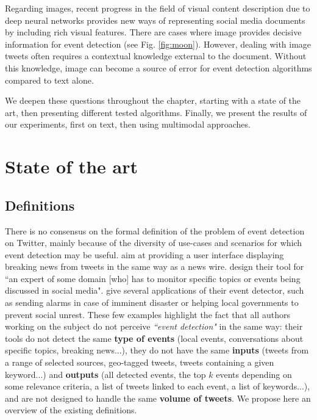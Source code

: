  Regarding images, recent progress in the field of visual content description due to deep neural networks provides new ways of representing social media documents by including rich visual features. There are cases where image provides decisive information for event detection (see Fig. \ref{fig:moon}). However, dealing with image tweets often requires a contextual knowledge external to the document. Without this knowledge, image can become a source of error for event detection algorithms compared to text alone.
 
We deepen these questions throughout the chapter, starting with a state of the art, then presenting different tested algorithms. Finally, we present the results of our experiments, first on text, then using multimodal approaches.


\section{State of the art}

\subsection{Definitions}
			There is no consensus on the formal definition of the problem of event detection on Twitter, mainly because of the diversity of use-cases and scenarios for which event detection may be useful. \citet{sankaranarayanan_twitterstand:_2009} aim at providing a user interface displaying breaking news from tweets in the same way as a news wire. \citet{aiello_sensing_2013} design their tool for ``an expert of some domain [who] has to monitor specific topics or events being discussed in social media". \citet{zhang_triovecevent:_2017} give several applications of their event detector, such as sending alarms in case of imminent disaster or helping local governments to prevent social unrest. These few examples highlight the fact that all authors working on the subject do not perceive \textit{``event detection"} in the same way: their tools do not detect the same \textbf{type of events} (local events, conversations about specific topics, breaking news...), they do not have the same \textbf{inputs} (tweets from a range of selected sources, geo-tagged tweets, tweets containing a given keyword...) and \textbf{outputs} (all detected events, the top $k$ events depending on some relevance criteria, a list of tweets linked to each event, a list of keywords...), and are not designed to handle the same \textbf{volume of tweets}. We propose here an overview of the existing definitions.
			
